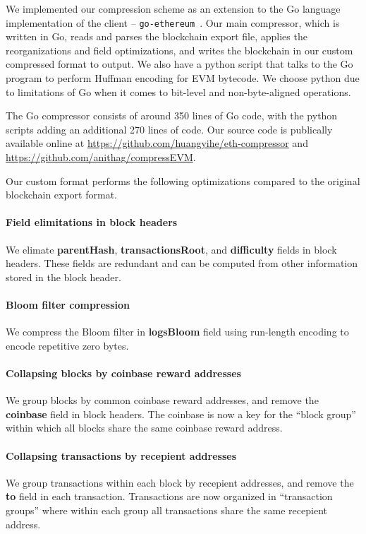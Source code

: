 We implemented our compression scheme as an extension to the Go language implementation of the \eth{} client -- \texttt{go-ethereum}~\cite{go-eth}.
Our main compressor, which is written in Go, reads and parses the blockchain export file,
applies the reorganizations and field optimizations, and writes the blockchain in our custom compressed format to output.
We also have a python script that talks to the Go program to perform Huffman encoding for EVM bytecode.
We choose python due to limitations of Go when it comes to bit-level and non-byte-aligned operations.

The Go compressor consists of around 350 lines of Go code,
with the python scripts adding an additional 270 lines of code.
Our source code is publically available online at
\url{https://github.com/huangyihe/eth-compressor}
and
\url{https://github.com/anithag/compressEVM}.

Our custom format performs the following optimizations compared to the original blockchain export format.

\paragraph{Field elimitations in block headers} We elimate \textbf{parentHash}, \textbf{transactionsRoot},
and \textbf{difficulty} fields in block headers. These fields are redundant and can be computed from
other information stored in the block header.

\paragraph{Bloom filter compression} We compress the Bloom filter in \textbf{logsBloom} field using run-length
encoding to encode repetitive zero bytes.

\paragraph{Collapsing blocks by coinbase reward addresses} We group blocks by common coinbase reward addresses, and remove
the \textbf{coinbase} field in block headers. The coinbase is now a key for the ``block group'' within which all blocks
share the same coinbase reward address.

\paragraph{Collapsing transactions by recepient addresses} We group transactions within each block by recepient addresses, and
remove the \textbf{to} field in each transaction. Transactions are now organized in ``transaction groups'' where within
each group all transactions share the same recepient address.

